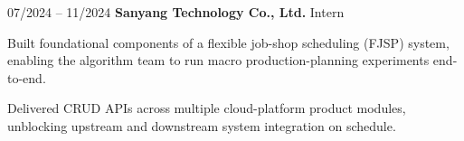 \begin{twocolentry}{07/2024 – 11/2024} \textbf{Sanyang Technology Co., Ltd.}
    \newline Intern \end{twocolentry}
\begin{onecolentry}
\begin{highlights}
\item Built foundational components of a flexible job-shop scheduling (FJSP) system, enabling the algorithm team to run macro production-planning experiments end-to-end.
\item Delivered CRUD APIs across multiple cloud-platform product modules, unblocking upstream and downstream system integration on schedule.
\end{highlights}
\end{onecolentry}

